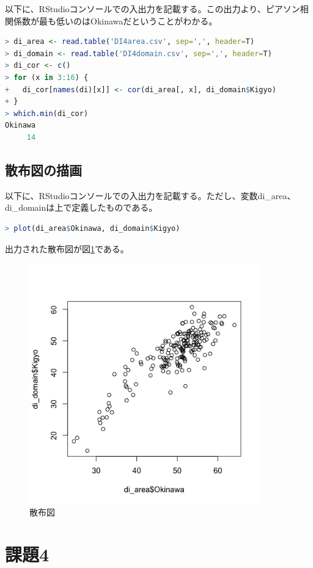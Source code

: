 \documentclass{jsarticle}
\begin{document}
以下に、RStudioコンソールでの入出力を記載する。この出力より、ピアソン相関係数が最も低いのはOkinawaだということがわかる。

\begin{lstlisting}[language=r]
> di_area <- read.table('DI4area.csv', sep=',', header=T)
> di_domain <- read.table('DI4domain.csv', sep=',', header=T)
> di_cor <- c()
> for (x in 3:16) {
+   di_cor[names(di)[x]] <- cor(di_area[, x], di_domain$Kigyo)
+ }
> which.min(di_cor)
Okinawa
     14 
\end{lstlisting}

\subsection{散布図の描画}

以下に、RStudioコンソールでの入出力を記載する。ただし、変数di\_area、di\_domainは上で定義したものである。

\begin{lstlisting}[language=r]
> plot(di_area$Okinawa, di_domain$Kigyo)
\end{lstlisting}

出力された散布図が図\ref{ex3}である。

\begin{figure}[H]
 \centering
   \includegraphics[width=100mm]{figures/ex3.png}
 \caption{散布図}
 \label{ex3}
\end{figure}

\section{課題4}
\end{document}
